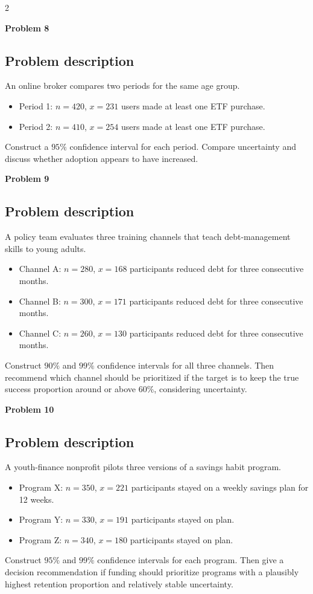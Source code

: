 \documentclass[12pt]{article}
\newcommand{\SubsectionBox}[1]{%
\noindent\colorbox{gray!30}{\parbox{\linewidth}{\textbf{#1}}}\par\vspace{0.35cm}%
}
\begin{document}
\begin{multicols}{2}
\vspace{0.5cm}
\SubsectionBox{Problem 8}
\subsection*{Problem description}
An online broker compares two periods for the same age group.
\begin{itemize}
  \item Period 1: \(n=420\), \(x=231\) users made at least one ETF purchase.
  \item Period 2: \(n=410\), \(x=254\) users made at least one ETF purchase.
\end{itemize}
Construct a \(95\%\) confidence interval for each period. Compare uncertainty and discuss whether adoption appears to have increased.

\vspace{0.5cm}
\SubsectionBox{Problem 9}
\subsection*{Problem description}
A policy team evaluates three training channels that teach debt-management skills to young adults.
\begin{itemize}
  \item Channel A: \(n=280\), \(x=168\) participants reduced debt for three consecutive months.
  \item Channel B: \(n=300\), \(x=171\) participants reduced debt for three consecutive months.
  \item Channel C: \(n=260\), \(x=130\) participants reduced debt for three consecutive months.
\end{itemize}
Construct \(90\%\) and \(99\%\) confidence intervals for all three channels. Then recommend which channel should be prioritized if the target is to keep the true success proportion around or above \(60\%\), considering uncertainty.

\vspace{0.5cm}
\SubsectionBox{Problem 10}
\subsection*{Problem description}
A youth-finance nonprofit pilots three versions of a savings habit program.
\begin{itemize}
  \item Program X: \(n=350\), \(x=221\) participants stayed on a weekly savings plan for 12 weeks.
  \item Program Y: \(n=330\), \(x=191\) participants stayed on plan.
  \item Program Z: \(n=340\), \(x=180\) participants stayed on plan.
\end{itemize}
Construct \(95\%\) and \(99\%\) confidence intervals for each program. Then give a decision recommendation if funding should prioritize programs with a plausibly highest retention proportion and relatively stable uncertainty.

\end{multicols}
\end{document}
